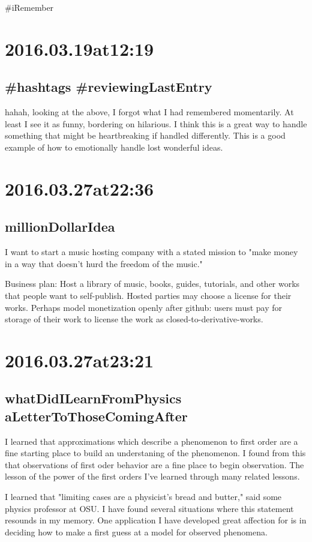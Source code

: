 #iRemember

\section*{ 2016.03.19at12:19 }
\subsection*{ #hashtags #reviewingLastEntry }
hahah, looking at the above, I forgot what I had remembered momentarily. At least I see it as funny, bordering on hilarious. I think this is a great way to handle something that might be heartbreaking if handled differently. This is a good example of how to emotionally handle lost wonderful ideas. 

\section*{ 2016.03.27at22:36 }
\subsection*{ millionDollarIdea }
I want to start a music hosting company with a stated mission to "make money in a way that doesn't hurd the freedom of the music."

Business plan:
Host a library of music, books, guides, tutorials, and other works that people want to self-publish. Hosted parties may choose a license for their works. Perhaps model monetization openly after github: users must pay for storage of their work to license the work as closed-to-derivative-works. 

\section*{ 2016.03.27at23:21 }
\subsection*{ whatDidILearnFromPhysics aLetterToThoseComingAfter }
I learned that approximations which describe a phenomenon to first order are a fine starting place to build an understaning of the phenomenon. I found from this that observations of first oder behavior are a fine place to begin observation. The lesson of the power of the first orders I've learned through many related lessons.

I learned that "limiting cases are a physicist's bread and butter," said some physics professor at OSU. I have found several situations where this statement resounds in my memory. One application I have developed great affection for is in deciding how to make a first guess at a model for observed phenomena.

